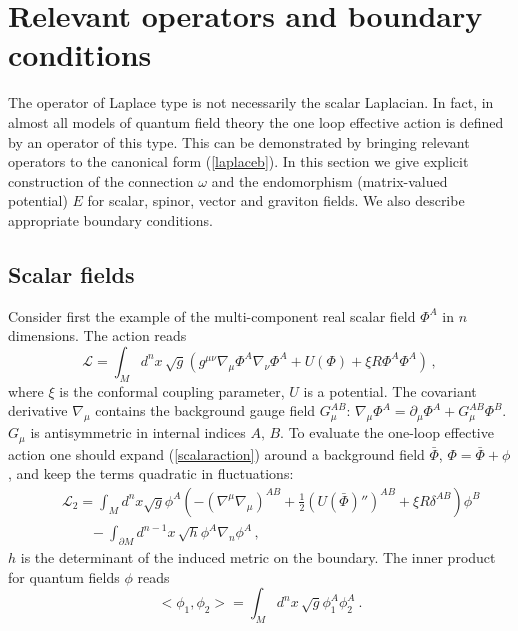\section{Relevant operators and boundary conditions}\label{sec3}
The operator of Laplace type is not necessarily the scalar
Laplacian. In fact, in almost all models of quantum field
theory the one loop effective action is defined by an operator
of this type. This can be demonstrated by bringing relevant
operators to the canonical form (\ref{laplaceb}). 
In this section we give explicit
construction of the connection $\omega$ and the endomorphism
(matrix-valued potential)
$E$ for scalar, spinor, vector and graviton fields. We also
describe appropriate boundary conditions.

\subsection{Scalar fields}\label{s3scalar}
Consider first the example of the multi-component real scalar
field $\Phi^A$ in $n$ dimensions. The action reads
\begin{equation}
\mathcal{L}
=\int_M d^nx\, \sqrt{g} (g^{\mu\nu}\nabla_\mu\Phi^A\nabla_\nu\Phi^A
+U(\Phi ) +\xi R \Phi^A\Phi^A ) \, ,\label{scalaraction}
\end{equation}
where $\xi$ is the conformal coupling parameter, $U$ is a potential.
The covariant derivative $\nabla_\mu$ contains the background
gauge field $G_\mu^{AB}$: $\nabla_\mu\Phi^A=\partial_\mu\Phi^A+
G_\mu^{AB}\Phi^B$. $G_\mu$ is antisymmetric in internal
indices $A,\,B$.
To evaluate the one-loop effective action one should expand 
(\ref{scalaraction}) around a
background field $\bar \Phi$, $\Phi=\bar \Phi +\phi$, and keep the
terms quadratic in fluctuations:
\begin{eqnarray}
&&\mathcal{L}_2
=\int_M d^nx \sqrt{g} \phi^A\left(-(\nabla^\mu\nabla_\mu )^{AB}
+\frac 12(U(\bar\Phi )'')^{AB} +\xi R \delta^{AB} \right)
\phi^B \nonumber \\
&&\qquad -\int_{\partial M}d^{n-1}x\,\sqrt{h} \phi^A \nabla_n \phi^A \,,
\label{S2scalar}
\end{eqnarray}
$h$ is the determinant of the induced metric on the boundary.
The inner product for quantum fields $\phi$ reads
\begin{equation}
<\phi_1,\phi_2>=\int_M d^nx\, \sqrt{g} \phi_1^A \phi_2^A \ .
\label{inn-prod-scal}
\end{equation}

